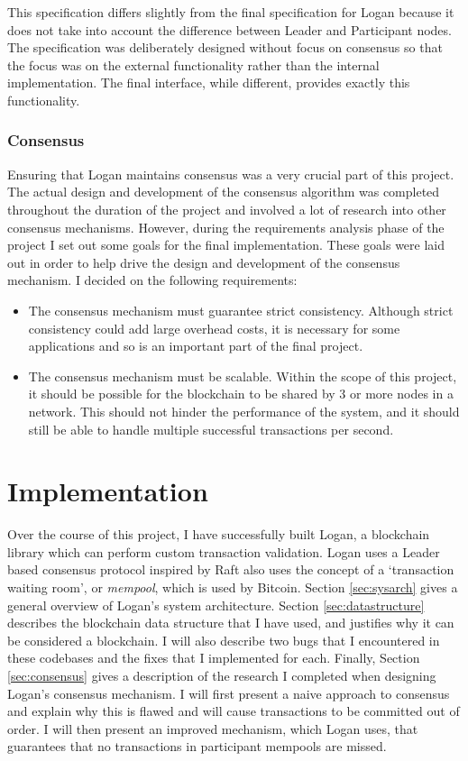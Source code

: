 \documentclass[12pt,a4paper,twoside,openright]{report}
\begin{document}
	This specification differs slightly from the final specification for Logan because it does not take into account the difference between Leader and Participant nodes.
	The specification was deliberately designed without focus on consensus so that the focus was on the external functionality rather than the internal implementation. 
	The final interface, while different, provides exactly this functionality.

	\subsection{Consensus}
	Ensuring that Logan maintains consensus was a very crucial part of this project. 
	The actual design and development of the consensus algorithm was completed throughout the duration of the project and involved a lot of research into other consensus mechanisms.
	However, during the requirements analysis phase of the project I set out some goals for the final implementation.
	These goals were laid out in order to help drive the design and development of the consensus mechanism. 
	I decided on the following requirements:
	\begin{itemize}
		\item The consensus mechanism must guarantee strict consistency. Although strict consistency could add large overhead costs, it is necessary for some applications and so is an important part of the final project.
		\item The consensus mechanism must be scalable. Within the scope of this project, it should be possible for the blockchain to be shared by 3 or more nodes in a network. This should not hinder the performance of the system, and it should still be able to handle multiple successful transactions per second.
	\end{itemize}

	\chapter{Implementation} \label{Implementation}
	Over the course of this project, I have successfully built Logan, a blockchain library which can perform custom transaction validation.
	Logan uses a Leader based consensus protocol inspired by Raft also uses the concept of a `transaction waiting room', or \textit{mempool}, which is used by Bitcoin.
	Section \ref{sec:sysarch} gives a general overview of Logan's system architecture.
	Section \ref{sec:datastructure} describes the blockchain data structure that I have used, and justifies why it can be considered a blockchain.
	I will also describe two bugs that I encountered in these codebases and the fixes that I implemented for each.
	Finally, Section \ref{sec:consensus} gives a description of the research I completed when designing Logan's consensus mechanism. 
	I will first present a naive approach to consensus and explain why this is flawed and will cause transactions to be committed out of order.
	I will then present an improved mechanism, which Logan uses, that guarantees that no transactions in participant mempools are missed.
\end{document}
